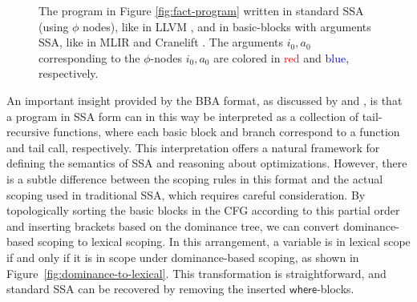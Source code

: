 \documentclass[acmsmall,screen,review]{acmart}
\newcounter{todos}
\newcommand{\TODO}[1]{{
  \stepcounter{todos}
  \begin{center}\large{\textcolor{red}{\textbf{TODO \arabic{todos}:} #1}}\end{center}
}}
\newcommand{\ms}[1]{\ensuremath{\mathsf{#1}}}
\begin{document}
\begin{figure}
  
  \caption{
    The program in Figure \ref{fig:fact-program} written in standard SSA (using $\phi$ nodes),
    like in LLVM \cite{llvm}, and in basic-blocks with arguments SSA, like in MLIR \cite{mlir} and
    Cranelift \cite{cranelift}. The arguments $i_0, a_0$ corresponding to the $\phi$-nodes $i_0,
    a_0$ are colored in \textcolor{red}{red} and \textcolor{blue}{blue}, respectively.
  }

  \Description{}
\end{figure}

An important insight provided by the BBA format, as discussed by \citet{appel-ssa} and
\citet{kelsey-95-cps}, is that a program in SSA form can in this way be interpreted as a collection
of tail-recursive functions, where each basic block and branch correspond to a function and tail
call, respectively. This interpretation offers a natural framework for defining the semantics of SSA
and reasoning about optimizations. However, there is a subtle difference between the scoping rules
in this format and the actual scoping used in traditional SSA, which requires careful consideration.
By topologically sorting the basic blocks in the CFG according to this partial order and inserting
brackets based on the dominance tree, we can convert dominance-based scoping to lexical scoping. In
this arrangement, a variable is in lexical scope if and only if it is in scope under dominance-based
scoping, as shown in Figure~\ref{fig:dominance-to-lexical}. This transformation is straightforward,
and standard SSA can be recovered by removing the inserted \ms{where}-blocks.
\end{document}
